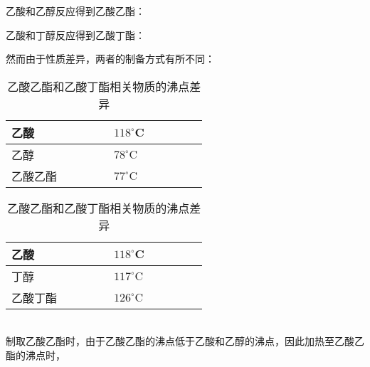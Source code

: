 \documentclass[UTF8]{ctexart}
\begin{document}
\newpage

    乙酸和乙醇反应得到乙酸乙酯：
    \begin{center}
    \end{center}\vspace{20pt}
    乙酸和丁醇反应得到乙酸丁酯：
    \begin{center}
    \end{center}\vspace{20pt}
    然而由于性质差异，两者的制备方式有所不同：\vspace{5pt}
    \begin{table}[h]
        \begin{center}
            \begin{tabular}{l|l}
                \hline
                乙酸~~~~~~~~&$118^\circ$C~~~~~~~~\\ \hline
                乙醇~~~~~~~~&$78^\circ$C~~~~~~~~\\ \hline
                乙酸乙酯~~~~~~~~&$77^\circ$C~~~~~~~~\\ \hline
            \end{tabular}
            \qquad\qquad
            \begin{tabular}{l|l}
                \hline
                乙酸~~~~~~~~&$118^\circ$C~~~~~~~~\\ \hline
                丁醇~~~~~~~~&$117^\circ$C~~~~~~~~\\ \hline
                乙酸丁酯~~~~~~~~&$126^\circ$C~~~~~~~~\\ \hline
            \end{tabular}
            \caption{乙酸乙酯和乙酸丁酯相关物质的沸点差异}
        \end{center}
    \end{table}\\
    制取乙酸乙酯时，由于乙酸乙酯的沸点低于乙酸和乙醇的沸点，因此加热至乙酸乙酯的沸点时，
\end{document}
